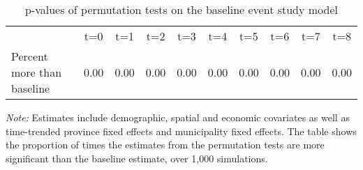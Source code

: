 \begin{table}[H]

\caption{\label{tab:apptablepermut}p-values of permutation tests on the baseline event study model}
\centering
\begin{threeparttable}
\begin{tabular}[t]{lccccccccl}
\toprule
\multicolumn{1}{c}{ } & \multicolumn{1}{c}{t=0} & \multicolumn{1}{c}{t=1} & \multicolumn{1}{c}{t=2} & \multicolumn{1}{c}{t=3} & \multicolumn{1}{c}{t=4} & \multicolumn{1}{c}{t=5} & \multicolumn{1}{c}{t=6} & \multicolumn{1}{c}{t=7} & \multicolumn{1}{c}{t=8} \\
\cmidrule(l{3pt}r{3pt}){2-2} \cmidrule(l{3pt}r{3pt}){3-3} \cmidrule(l{3pt}r{3pt}){4-4} \cmidrule(l{3pt}r{3pt}){5-5} \cmidrule(l{3pt}r{3pt}){6-6} \cmidrule(l{3pt}r{3pt}){7-7} \cmidrule(l{3pt}r{3pt}){8-8} \cmidrule(l{3pt}r{3pt}){9-9} \cmidrule(l{3pt}r{3pt}){10-10}
Percent more than baseline & 0.00 & 0.00 & 0.00 & 0.00 & 0.00 & 0.00 & 0.00 & 0.00 & 0.00\\
\bottomrule
\end{tabular}
\begin{tablenotes}[para]
\item \footnotesize \textit{Note:} Estimates include demographic, spatial and economic covariates as well as time-trended province fixed effects
      and municipality fixed effects. The table shows the proportion of times the estimates from the permutation tests are more significant than the
      baseline estimate, over 1,000 simulations.
\end{tablenotes}
\end{threeparttable}
\end{table}
